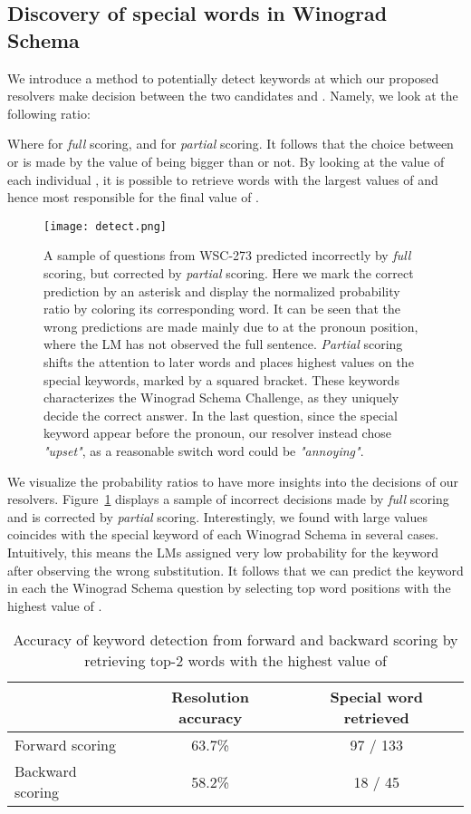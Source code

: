 \documentclass{article}
\begin{document}
\subsection{Discovery of special words in Winograd Schema}


We introduce a method to potentially detect keywords at which our proposed resolvers make decision between the two candidates  and . Namely, we look at the following ratio:



Where  for \emph{full} scoring, and  for \emph{partial} scoring. It follows that the choice between  or  is made by the value of  being bigger than  or not. By looking at the value of each individual , it is possible to retrieve words with the largest values of  and hence most responsible for the final value of .

\begin{figure}[h!]
\centering
\texttt{[image: detect.png]}
\caption{A sample of questions from WSC-273 predicted incorrectly by \emph{full} scoring, but corrected by \emph{partial} scoring. Here we mark the correct prediction by an asterisk and display the normalized probability ratio  by coloring its corresponding word. It can be seen that the wrong predictions are made mainly due to  at the pronoun position, where the LM has not observed the full sentence. \emph{Partial} scoring shifts the attention to later words and places highest  values on the special keywords, marked by a squared bracket. These keywords characterizes the Winograd Schema Challenge, as they uniquely decide the correct answer. In the last question, since the special keyword appear before the pronoun, our resolver instead chose {\it "upset"}, as a reasonable switch word could be {\it "annoying"}.}
\label{fig:detect}
\end{figure}

We visualize the probability ratios  to have more insights into the decisions of our resolvers. Figure~\ref{fig:detect} displays a sample of incorrect decisions made by \emph{full} scoring and is corrected by \emph{partial} scoring. Interestingly, we found  with large values coincides with the special keyword of each Winograd Schema in several cases. Intuitively, this means the LMs assigned very low probability for the keyword after observing the wrong substitution. It follows that we can predict the keyword in each the Winograd Schema question by selecting top word positions with the highest value of .

\begin{table}[h!]
  \caption{Accuracy of keyword detection from forward and backward scoring by retrieving top-2 words with the highest value of }
  \label{tab:detect}
  \centering
  \small
  \begin{tabular}{lcc}
    \toprule
       & Resolution accuracy & Special word retrieved  \\
    \midrule
    Forward scoring & 63.7\% & 97 / 133 \\
    Backward scoring & 58.2\% & 18 / 45 \\
\bottomrule
  \end{tabular}
\end{table}
\end{document}
